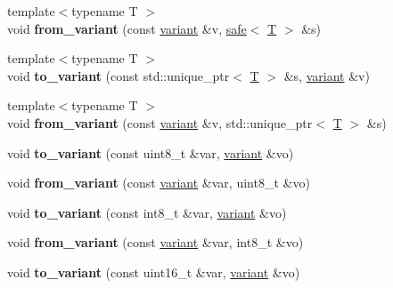 \begin{DoxyCompactItemize}
\item 
\mbox{\label{namespacefc_a41375d1694a305175064113762bfe4ff}} 
{\footnotesize template$<$typename T $>$ }\\void {\bfseries from\+\_\+variant} (const \mbox{\hyperlink{classfc_1_1variant}{variant}} \&v, \mbox{\hyperlink{structfc_1_1safe}{safe}}$<$ \mbox{\hyperlink{struct_t}{T}} $>$ \&s)
\item 
\mbox{\label{namespacefc_aaa7e50ed2401dcbc5a9b8e7f76d53a5f}} 
{\footnotesize template$<$typename T $>$ }\\void {\bfseries to\+\_\+variant} (const std\+::unique\+\_\+ptr$<$ \mbox{\hyperlink{struct_t}{T}} $>$ \&s, \mbox{\hyperlink{classfc_1_1variant}{variant}} \&v)
\item 
\mbox{\label{namespacefc_a790fb03b4ffa7fe64f996a1d944128ac}} 
{\footnotesize template$<$typename T $>$ }\\void {\bfseries from\+\_\+variant} (const \mbox{\hyperlink{classfc_1_1variant}{variant}} \&v, std\+::unique\+\_\+ptr$<$ \mbox{\hyperlink{struct_t}{T}} $>$ \&s)
\item 
\mbox{\label{namespacefc_a798664dba25d52610b188fcdd9fccbd8}} 
void {\bfseries to\+\_\+variant} (const uint8\+\_\+t \&var, \mbox{\hyperlink{classfc_1_1variant}{variant}} \&vo)
\item 
\mbox{\label{namespacefc_adfe825d40337fe6f6f6b8b38f8369985}} 
void {\bfseries from\+\_\+variant} (const \mbox{\hyperlink{classfc_1_1variant}{variant}} \&var, uint8\+\_\+t \&vo)
\item 
\mbox{\label{namespacefc_ab65c7b571eca8941671f290add12fdf4}} 
void {\bfseries to\+\_\+variant} (const int8\+\_\+t \&var, \mbox{\hyperlink{classfc_1_1variant}{variant}} \&vo)
\item 
\mbox{\label{namespacefc_a33aff82f77c8b6f533c72e021df06b75}} 
void {\bfseries from\+\_\+variant} (const \mbox{\hyperlink{classfc_1_1variant}{variant}} \&var, int8\+\_\+t \&vo)
\item 
\mbox{\label{namespacefc_a5d7b1e0e75501752b3da446d780f8a46}} 
void {\bfseries to\+\_\+variant} (const uint16\+\_\+t \&var, \mbox{\hyperlink{classfc_1_1variant}{variant}} \&vo)

\end{DoxyCompactItemize}
